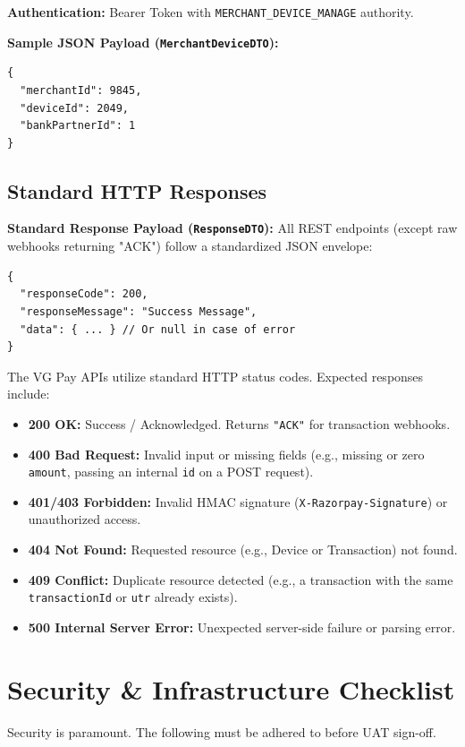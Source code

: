 \documentclass[11pt,a4paper]{article}
\begin{document}
\textbf{Authentication:} Bearer Token with \texttt{MERCHANT\_DEVICE\_MANAGE} authority.

\textbf{Sample JSON Payload (\texttt{MerchantDeviceDTO}):}
\begin{lstlisting}
{
  "merchantId": 9845,
  "deviceId": 2049,
  "bankPartnerId": 1
}
\end{lstlisting}

\subsection{Standard HTTP Responses}
\textbf{Standard Response Payload (\texttt{ResponseDTO}):}
All REST endpoints (except raw webhooks returning "ACK") follow a standardized JSON envelope:
\begin{lstlisting}
{
  "responseCode": 200,
  "responseMessage": "Success Message",
  "data": { ... } // Or null in case of error
}
\end{lstlisting}

The VG Pay APIs utilize standard HTTP status codes. Expected responses include:
\begin{itemize}
    \item \textbf{200 OK:} Success / Acknowledged. Returns \texttt{"ACK"} for transaction webhooks.
    \item \textbf{400 Bad Request:} Invalid input or missing fields (e.g., missing or zero \texttt{amount}, passing an internal \texttt{id} on a POST request).
    \item \textbf{401/403 Forbidden:} Invalid HMAC signature (\texttt{X-Razorpay-Signature}) or unauthorized access.
    \item \textbf{404 Not Found:} Requested resource (e.g., Device or Transaction) not found.
    \item \textbf{409 Conflict:} Duplicate resource detected (e.g., a transaction with the same \texttt{transaction\allowbreak Id} or \texttt{utr} already exists).
    \item \textbf{500 Internal Server Error:} Unexpected server-side failure or parsing error.
\end{itemize}

\newpage
\section{Security \& Infrastructure Checklist}

\begin{tcolorbox}[colback=red!5!white,colframe=red!75!black,title=IMPORTANT]
Security is paramount. The following must be adhered to before UAT sign-off.
\end{tcolorbox}
\end{document}
